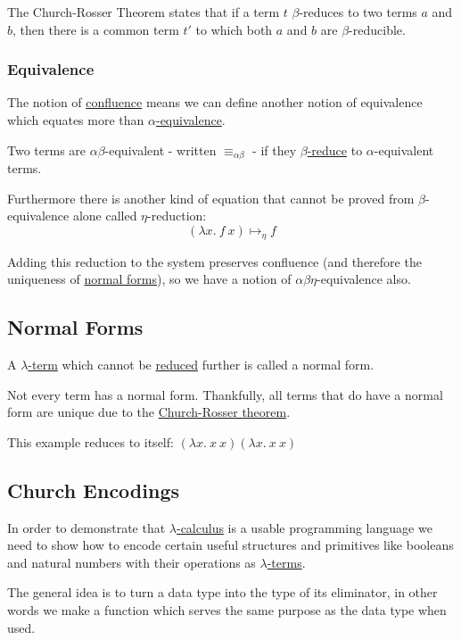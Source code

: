 \documentclass{article}
\begin{document}
The Church-Rosser Theorem states that if a term $t$ $\beta$-reduces to two terms $a$ and $b$, then there is a common term $t'$ to which both $a$ and $b$ are $\beta$-reducible.

\subsubsection{Equivalence}\label{equivalence}
The notion of \hyperref[confluence]{confluence} means we can define another notion of equivalence which equates more than \hyperref[alpha-equivalence]{$\alpha$-equivalence}.

Two terms are $\alpha\beta$-equivalent - written $\equiv_{\alpha\beta}$ - if they \hyperref[beta-reduction]{$\beta$-reduce} to $\alpha$-equivalent terms.

Furthermore there is another kind of equation that cannot be proved from $\beta$-equivalence alone called $\eta$-reduction:
\[(\lambda x.\:f\:x) \mapsto_\eta f\]

Adding this reduction to the system preserves confluence (and therefore the uniqueness of \hyperref[normal-forms]{normal forms}), so we have a notion of $\alpha\beta\eta$-equivalence also.

\subsection{Normal Forms}\label{normal-forms}
A \hyperref[lambda-term]{$\lambda$-term} which cannot be \hyperref[beta-reduction]{reduced} further is called a normal form.

Not every term has a normal form. Thankfully, all terms that do have a normal form are unique due to the \hyperref[church-rosser]{Church-Rosser theorem}.

This example reduces to itself:
$(\lambda x.\:x\:x)(\lambda x.\:x\:x)$

\subsection{Church Encodings}\label{church-encoding}
In order to demonstrate that \hyperref[lambda-calculus]{$\lambda$-calculus} is a usable programming language we need to show how to encode certain useful structures and primitives like booleans and natural numbers with their operations as \hyperref[lambda-term]{$\lambda$-terms}.

The general idea is to turn a data type into the type of its eliminator, in other words we make a function which serves the same purpose as the data type when used.
\end{document}
